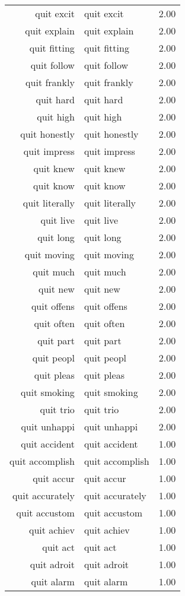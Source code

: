 \begin{table}[ht]
\begin{tabular}{rlr}
  quit excit & quit excit & 2.00 \\ 
  quit explain & quit explain & 2.00 \\ 
  quit fitting & quit fitting & 2.00 \\ 
  quit follow & quit follow & 2.00 \\ 
  quit frankly & quit frankly & 2.00 \\ 
  quit hard & quit hard & 2.00 \\ 
  quit high & quit high & 2.00 \\ 
  quit honestly & quit honestly & 2.00 \\ 
  quit impress & quit impress & 2.00 \\ 
  quit knew & quit knew & 2.00 \\ 
  quit know & quit know & 2.00 \\ 
  quit literally & quit literally & 2.00 \\ 
  quit live & quit live & 2.00 \\ 
  quit long & quit long & 2.00 \\ 
  quit moving & quit moving & 2.00 \\ 
  quit much & quit much & 2.00 \\ 
  quit new & quit new & 2.00 \\ 
  quit offens & quit offens & 2.00 \\ 
  quit often & quit often & 2.00 \\ 
  quit part & quit part & 2.00 \\ 
  quit peopl & quit peopl & 2.00 \\ 
  quit pleas & quit pleas & 2.00 \\ 
  quit smoking & quit smoking & 2.00 \\ 
  quit trio & quit trio & 2.00 \\ 
  quit unhappi & quit unhappi & 2.00 \\ 
  quit accident & quit accident & 1.00 \\ 
  quit accomplish & quit accomplish & 1.00 \\ 
  quit accur & quit accur & 1.00 \\ 
  quit accurately & quit accurately & 1.00 \\ 
  quit accustom & quit accustom & 1.00 \\ 
  quit achiev & quit achiev & 1.00 \\ 
  quit act & quit act & 1.00 \\ 
  quit adroit & quit adroit & 1.00 \\ 
  quit alarm & quit alarm & 1.00 \\ 

\end{tabular}
\end{table}
